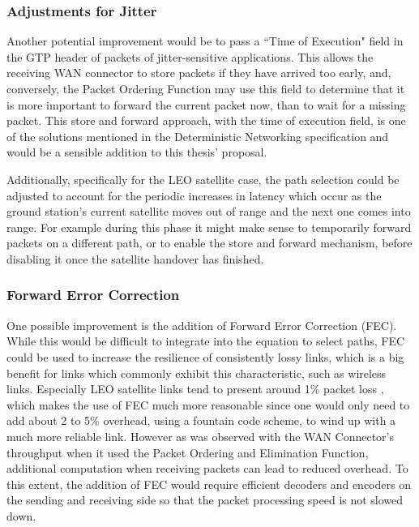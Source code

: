 \subsubsection{Adjustments for Jitter}

Another potential improvement would be to pass a “Time of Execution" field in the GTP header of packets of jitter-sensitive applications. This allows the receiving WAN connector to store packets if they have arrived too early, and, conversely, the Packet Ordering Function may use this field to determine that it is more important to forward the current packet now, than to wait for a missing packet. This store and forward approach, with the time of execution field, is one of the solutions mentioned in the Deterministic Networking specification and would be a sensible addition to this thesis' proposal.

Additionally, specifically for the LEO satellite case, the path selection could be adjusted to account for the periodic increases in latency which occur as the ground station's current satellite moves out of range and the next one comes into range. For example during this phase it might make sense to temporarily forward packets on a different path, or to enable the store and forward mechanism, before disabling it once the satellite handover has finished.

\subsubsection{Forward Error Correction}

One possible improvement is the addition of Forward Error Correction (FEC). While this would be difficult to integrate into the equation to select paths, FEC could be used to increase the resilience of consistently lossy links, which is a big benefit for links which commonly exhibit this characteristic, such as wireless links. Especially LEO satellite links tend to present around 1\% packet loss \cite{deutschmann2022broadband}, which makes the use of FEC much more reasonable since one would only need to add about 2 to 5\% overhead, using a fountain code scheme, to wind up with a much more reliable link. However as was observed with the WAN Connector's throughput when it used the Packet Ordering and Elimination Function, additional computation when receiving packets can lead to reduced overhead. To this extent, the addition of FEC would require efficient decoders and encoders on the sending and receiving side so that the packet processing speed is not slowed down.

